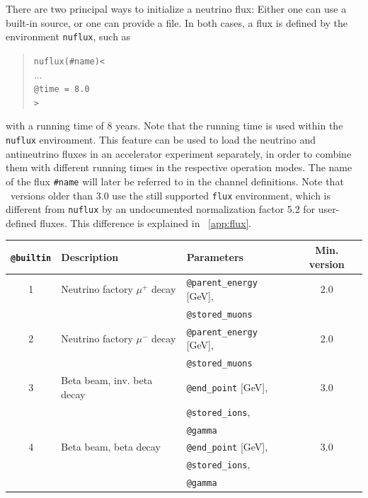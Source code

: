 There are two principal ways to initialize a neutrino flux: 
Either one can use 
a built-in source, or one can provide a file. In both cases,
a flux is defined by the environment {\tt nuflux}, such as
\begin{quote}
  {\tt nuflux(\#name)<\\
\tb $\ldots$\\
\tb @time = 8.0 \\
>}
\end{quote}
with a running time of $8$ years. Note that the running time is used within
the {\tt nuflux} environment. This feature can be used to load the neutrino
and antineutrino fluxes in an accelerator experiment separately, in order
to combine them with different running times in the respective operation modes.
The name of the flux {\tt \#name} will later be referred to in the channel definitions. Note that \GLOBES\ versions older than 3.0 use the still supported {\tt flux} environment, which is different from {\tt nuflux} by an undocumented normalization factor 5.2 for user-defined fluxes. This difference is explained in \App~\ref{app:flux}.


\begin{table}[t]
\begin{center}
\begin{tabular}{|cllc|}
\hline
{\tt @builtin} & Description & Parameters & Min. version \\
\hline
1 & Neutrino factory $\mu^+$ decay & {\tt @parent\_energy} [GeV], & 2.0 \\
& & {\tt @stored\_muons} &  \\
2 & Neutrino factory $\mu^-$ decay & {\tt @parent\_energy} [GeV], & 2.0 \\
& & {\tt @stored\_muons} &  \\
3 & Beta beam, inv. beta decay & {\tt @end\_point} [GeV], & 3.0 \\
& & {\tt @stored\_ions}, &  \\
& & {\tt @gamma} & \\
4 & Beta beam, beta decay & {\tt @end\_point} [GeV], & 3.0 \\
& & {\tt @stored\_ions}, &  \\
& & {\tt @gamma} & \\
\hline
\end{tabular}
\end{center}
\end{table}

